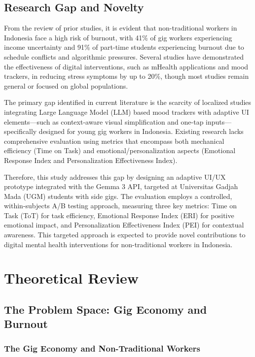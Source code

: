\subsection{Research Gap and Novelty}

From the review of prior studies, it is evident that non-traditional workers in Indonesia face a high risk of burnout, with 41\% of gig workers experiencing income uncertainty and 91\% of part-time students experiencing burnout due to schedule conflicts and algorithmic pressures. Several studies have demonstrated the effectiveness of digital interventions, such as mHealth applications and mood trackers, in reducing stress symptoms by up to 20\%, though most studies remain general or focused on global populations.

The primary gap identified in current literature is the scarcity of localized studies integrating Large Language Model (LLM) based mood trackers with adaptive UI elements—such as context-aware visual simplification and one-tap inputs—specifically designed for young gig workers in Indonesia. Existing research lacks comprehensive evaluation using metrics that encompass both mechanical efficiency (Time on Task) and emotional/personalization aspects (Emotional Response Index and Personalization Effectiveness Index).

Therefore, this study addresses this gap by designing an adaptive UI/UX prototype integrated with the Gemma 3 API, targeted at Universitas Gadjah Mada (UGM) students with side gigs. The evaluation employs a controlled, within-subjects A/B testing approach, measuring three key metrics: Time on Task (ToT) for task efficiency, Emotional Response Index (ERI) for positive emotional impact, and Personalization Effectiveness Index (PEI) for contextual awareness. This targeted approach is expected to provide novel contributions to digital mental health interventions for non-traditional workers in Indonesia.

\section{Theoretical Review}

\subsection{The Problem Space: Gig Economy and Burnout}

\subsubsection{The Gig Economy and Non-Traditional Workers}

